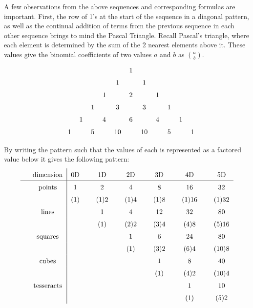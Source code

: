A few observations from the above sequences and corresponding formulas are important. First, the row of 1's at the start of the sequence in a diagonal pattern, as well as the continual addition of terms from the previous sequence in each other sequence brings to mind the Pascal Triangle. Recall Pascal's triangle, where each element is determined by the sum of the 2 nearest elements above it. These values give the binomial coefficients of two values $a$ and $b$ as $\binom{a}{b}$.
\begin{equation}
	\renewcommand{\arraystretch}{1.5}
	\begin{tabular}{cccccccccccc}
		&      &      &      &      &      &  1   &      &      &      &      &      \\
		&      &      &      &      &  1   &      &  1   &      &      &      &      \\
		&      &      &      &  1   &      &  2   &      &  1   &      &      &      \\
		&      &      &  1   &      &  3   &      &  3   &      &  1   &      &      \\
		&      &  1   &      &  4   &      &  6   &      &  4   &      &  1   &      \\
		&  1   &      &  5   &      &  10  &      &  10  &      &   5  &      &   1   \\
	\end{tabular}\label{pascals_triangle}
\end{equation}

By writing the pattern such that the values of each is represented as a factored value below it gives the following pattern:
\begin{equation}
	\renewcommand{\arraystretch}{1.5}
	\begin{tabular}{lc|ccccccccccc}
		&dimension&   0D  &      &   1D   &      &  2D    &      &   3D   &      &  4D    &      &  5D    \\
	\hline
	&points&   1   &     &   2    &      &   4    &      &   8  &      &   16   &      &   32   \\
	&      &  (1)  &     &  (1)2  &      &   (1)4 &      & (1)8 &      & (1)16  &      &  (1)32 \\
	&lines&   && 1   &     &   4    &      &   12   &      &   32 &      &   80     \\
	&      &  &&(1)  &     &  (2)2  &      &   (3)4 &      & (4)8 &      &  (5)16   \\
	&squares&  &&&&1   &     &   6    &      &   24   &      &   80   \\
	&      & &&&& (1)  &     &  (3)2  &      &   (6)4 &      & (10)8 \\
	&cubes&   &&&&&& 1   &     &   8    &      &   40    \\
	&      & &&&&&& (1)  &     &  (4)2  &      &  (10)4  \\
	&tesseracts& &&&&&&&&1 &     &   10    \\
	&     &  &&&&&&&&  (1) &     &   (5)2  \\
\end{tabular}
\end{equation}

